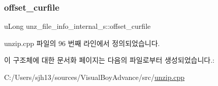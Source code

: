 \subsubsection{\texorpdfstring{offset\+\_\+curfile}{offset\_curfile}}
{\footnotesize\ttfamily u\+Long unz\+\_\+file\+\_\+info\+\_\+internal\+\_\+s\+::offset\+\_\+curfile}



unzip.\+cpp 파일의 96 번째 라인에서 정의되었습니다.



이 구조체에 대한 문서화 페이지는 다음의 파일로부터 생성되었습니다.\+:\begin{DoxyCompactItemize}
\item 
C\+:/\+Users/sjh13/sources/\+Visual\+Boy\+Advance/src/\mbox{\hyperlink{unzip_8cpp}{unzip.\+cpp}}\end{DoxyCompactItemize}
